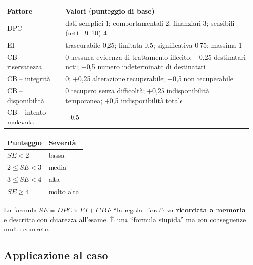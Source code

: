 \begin{center}
\small
\begin{tabularx}{\linewidth}{l X}
\toprule
\textbf{Fattore} & \textbf{Valori (punteggio di base)}\\ \midrule
DPC & dati semplici 1; comportamentali 2; finanziari 3; sensibili (artt.~9--10) 4\\
EI  & trascurabile 0,25; limitata 0,5; significativa 0,75; massima 1\\
CB -- riservatezza & 0 nessuna evidenza di trattamento illecito; +0,25 destinatari noti;
  +0,5 numero indeterminato di destinatari\\
CB -- integrità & 0; +0,25 alterazione recuperabile; +0,5 non recuperabile\\
CB -- disponibilità & 0 recupero senza difficoltà; +0,25 indisponibilità temporanea;
  +0,5 indisponibilità totale\\
CB -- intento malevolo & +0,5\\ \bottomrule
\end{tabularx}
\end{center}

\begin{center}
\small
\begin{tabular}{ll}
\toprule
\textbf{Punteggio} & \textbf{Severità}\\ \midrule
$SE < 2$ & bassa\\
$2 \le SE < 3$ & media\\
$3 \le SE < 4$ & alta\\
$SE \ge 4$ & molto alta\\ \bottomrule
\end{tabular}
\end{center}

\begin{esame}
La formula $SE = DPC \times EI + CB$ è ``la regola d'oro'': va \textbf{ricordata a memoria} e descritta
con chiarezza all'esame. È una ``formula stupida'' ma con conseguenze molto concrete.
\end{esame}

\subsection{Applicazione al caso}
